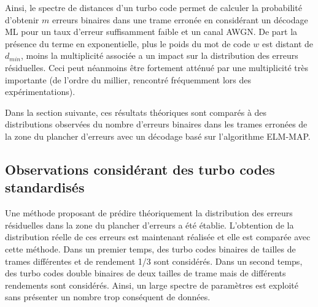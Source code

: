 Ainsi, le spectre de distances d'un turbo code permet de calculer la probabilité 
d'obtenir $m$ erreurs binaires dans une trame erronée en considérant un décodage ML pour un taux d'erreur suffisamment 
faible et un canal AWGN. De part la présence du terme en exponentielle, plus le poids du mot de code $w$ est distant 
de $d_{min}$, moins la multiplicité associée a un impact sur la distribution des erreurs résiduelles. Ceci peut néanmoins
être fortement atténué par une multiplicité très importante (de l'ordre du millier, rencontré fréquemment lors des 
expérimentations).

Dans la section suivante, ces résultats théoriques sont comparés à des distributions observées du nombre d'erreurs binaires dans les
trames erronées de la zone du plancher d'erreurs avec un décodage basé sur l'algorithme ELM-MAP.

\subsection{Observations considérant des turbo codes standardisés}
Une méthode proposant de prédire théoriquement la distribution des erreurs résiduelles dans la zone du plancher d'erreurs 
a été  établie. L'obtention 
de la distribution réelle de ces erreurs est maintenant réalisée et elle est comparée avec cette méthode. Dans un premier 
temps, des turbo codes binaires de tailles de 
trames différentes et de rendement 1/3 sont considérés. Dans un second temps, des turbo codes double binaires de deux
tailles de trame mais de différents rendements sont considérés. Ainsi, un large spectre de paramètres est exploité sans
présenter un nombre trop conséquent de données.

